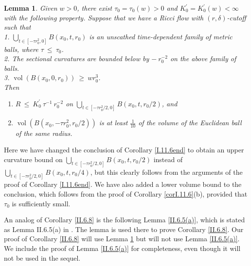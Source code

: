 \documentclass[12pt]{amsart}
\newcommand{\vol}{\operatorname{vol}}
\newcommand{\de}{\delta}
\numberwithin{equation}{section}
\theoremstyle{plain}
\newtheorem{lemma}[equation]{Lemma}
\theoremstyle{definition}
\theoremstyle{remark}
\begin{document}
\begin{lemma} \label{I.11.6(a)}
Given $w > 0$, there exist $\tau_0 = \tau_0(w) > 0$ and 
$K_0^\prime = K_0^\prime(w) < \infty$
with the following property. Suppose that we have
a Ricci flow with $(r,\de)$-cutoff such that \\
1. $\bigcup_{t \in 
[-\tau r_0^2, 0]} B(x_0, t, r_0)$ is an unscathed time-dependent family of
metric balls, where $\tau \: \le \: \tau_0$. \\
2. The sectional curvatures are bounded below by $- \: r_0^{-2}$ 
on the
above family of balls. \\
3. $\vol(B(x_0, 0, r_0)) \: \ge \: w r_0^3$. \\

Then
\begin{enumerate}
\item 
$R \: \le \: K_0^\prime \: \tau^{-1} \: r_0^{-2}$
on $\bigcup_{ t \in [- \tau r_0^2/2, 0]} B(x_0, t, r_0/2)$, and
\item $\vol(B(x_0, -\tau r_0^2, r_0/2))$ is at least $\frac{1}{10}$
of the volume of the Euclidean ball of the same radius.
\end{enumerate}
\end{lemma}

Here we have changed the conclusion of Corollary \ref{I.11.6end} to obtain an
upper curvature bound on 
$\bigcup_{ t \in [- \tau r_0^2/2, 0]} B(x_0, t, r_0/2)$
instead of $\bigcup_{ t \in [- \tau r_0^2/2, 0]} B(x_0, t, r_0/4)$,
but this clearly follows from the arguments of the proof of Corollary
\ref{I.11.6end}. We have also added a lower volume bound to the conclusion,
which follows from the proof of Corollary \ref{corI.11.6}(b), provided
that $\tau_0$ is sufficiently small.

An analog of Corollary \ref{II.6.8} is the following
Lemma \ref{II.6.5(a)}, which is stated as Lemma II.6.5(a)
in \cite{Perelman2}. The lemma is used there to prove Corollary \ref{II.6.8}.
Our proof of Corollary \ref{II.6.8} will use Lemma \ref{I.11.6(a)} but will
not use Lemma \ref{II.6.5(a)}.
We include the proof of Lemma \ref{II.6.5(a)} for completeness, even
though it will not be used in the sequel.
\end{document}
